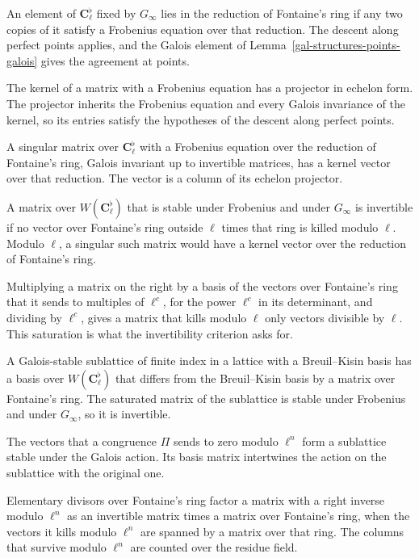 An element of $\mathbf C_\ell^\flat$ fixed by $G_\infty$ lies in the reduction of Fontaine's ring if any two
copies of it satisfy a Frobenius equation over that reduction. The descent along perfect points applies, and the
Galois element of Lemma~\ref{gal-structures-points-galois} gives the agreement at points.

The kernel of a matrix with a Frobenius equation has a projector in echelon form. The projector inherits the
Frobenius equation and every Galois invariance of the kernel, so its entries satisfy the hypotheses of the
descent along perfect points.

A singular matrix over $\mathbf C_\ell^\flat$ with a Frobenius equation over the reduction of Fontaine's ring,
Galois invariant up to invertible matrices, has a kernel vector over that reduction. The vector is a column of
its echelon projector.

A matrix over $W(\mathbf C_\ell^\flat)$ that is stable under Frobenius and under $G_\infty$ is invertible if no
vector over Fontaine's ring outside $\ell$ times that ring is killed modulo $\ell$. Modulo $\ell$, a singular
such matrix would have a kernel vector over the reduction of Fontaine's ring.

Multiplying a matrix on the right by a basis of the vectors over Fontaine's ring that it sends to multiples of
$\ell^c$, for the power $\ell^c$ in its determinant, and dividing by $\ell^c$, gives a matrix that kills modulo
$\ell$ only vectors divisible by $\ell$. This saturation is what the invertibility criterion asks for.

A Galois-stable sublattice of finite index in a lattice with a Breuil--Kisin basis has a basis over
$W(\mathbf C_\ell^\flat)$ that differs from the Breuil--Kisin basis by a matrix over Fontaine's ring. The
saturated matrix of the sublattice is stable under Frobenius and under $G_\infty$, so it is invertible.

The vectors that a congruence $\Pi$ sends to zero modulo $\ell^n$ form a sublattice stable under the Galois
action. Its basis matrix intertwines the action on the sublattice with the original one.

Elementary divisors over Fontaine's ring factor a matrix with a right inverse modulo $\ell^n$ as an invertible
matrix times a matrix over Fontaine's ring, when the vectors it kills modulo $\ell^n$ are spanned by a matrix over
that ring. The columns that survive modulo $\ell^n$ are counted over the residue field.


